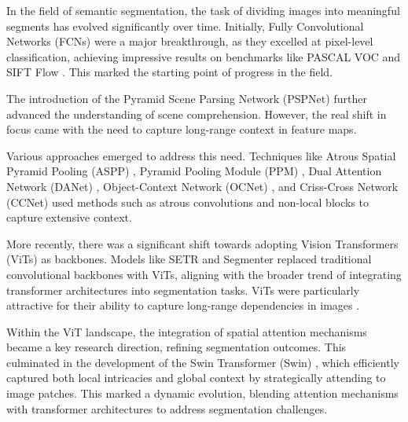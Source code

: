 In the field of semantic segmentation, the task of dividing images into meaningful segments has evolved significantly over time. Initially, Fully Convolutional Networks (FCNs) were a major breakthrough, as they excelled at pixel-level classification, achieving impressive results on benchmarks like PASCAL VOC and SIFT Flow \cite{long2015fully}. This marked the starting point of progress in the field.

The introduction of the Pyramid Scene Parsing Network (PSPNet) \cite{zhao2017pyramid} further advanced the understanding of scene comprehension. However, the real shift in focus came with the need to capture long-range context in feature maps.

Various approaches emerged to address this need. Techniques like Atrous Spatial Pyramid Pooling (ASPP) \cite{chen2017rethinking}, Pyramid Pooling Module (PPM) \cite{zhao2017pyramid}, Dual Attention Network (DANet) \cite{fu2019dual}, Object-Context Network (OCNet) \cite{yuan2018ocnet}, and Criss-Cross Network (CCNet) \cite{huang2019ccnet} used methods such as atrous convolutions and non-local blocks to capture extensive context.

More recently, there was a significant shift towards adopting Vision Transformers (ViTs) \cite{dosovitskiy2020image} as backbones. Models like SETR \cite{zheng2021rethinking} and Segmenter \cite{strudel2021segmenter} replaced traditional convolutional backbones with ViTs, aligning with the broader trend of integrating transformer architectures into segmentation tasks. ViTs were particularly attractive for their ability to capture long-range dependencies in images \cite{dosovitskiy2020image}\cite{strudel2021segmenter}.

Within the ViT landscape, the integration of spatial attention mechanisms became a key research direction, refining segmentation outcomes. This culminated in the development of the Swin Transformer (Swin) \cite{liu2021swin}, which efficiently captured both local intricacies and global context by strategically attending to image patches. This marked a dynamic evolution, blending attention mechanisms with transformer architectures to address segmentation challenges.

